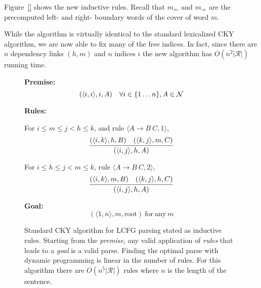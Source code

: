 \documentclass[11pt,letterpaper]{article}
\DeclareMathOperator*{\argmax}{arg\,max}
\newcommand{\rules}{\mathcal{R}}
\newcommand{\Left}[1]{#1_{\Leftarrow}}
\newcommand{\Right}[1]{#1_{\Rightarrow}}
\newcommand{\Span}[1]{\langle #1 \rangle}
\newcommand{\tri}{\Span{\Left{m}, \Right{m}}}
\begin{document}

Figure~\ref{} shows the new inductive rules.
Recall that $\Left{m}$ and $\Right{m}$ are the precomputed left- and right- boundary words of the cover of word $m$.

While the algorithm is virtually identical to the standard lexicalized CKY algorithm, we are now able to fix many of the free indices. In fact, since there are $n$ dependency links $(h, m)$ and $n$ indices $i$ the new algorithm has $O(n^2|\rules|)$ running time.


\begin{figure}
  \noindent \textbf{Premise:}
  \[(\Span{i, i}, i, A)\ \ \ \forall i \in \{1 \ldots n\}, A \in {\cal N}\]

  \noindent\textbf{Rules:}


   For $i\leq m \leq j < h \leq k$,  and  rule  $\langle A \rightarrow B\ C, 1\rangle$,
   \[\infer{( \Span{i, j},  h,  A)}{( \Span{i, k}, h, B)  &  ( \Span{k, j}, m, C) } \]

   For $i\leq h \leq j < m \leq k$, rule  $\langle A \rightarrow B\ C,  2\rangle$,
   \[\infer{(\Span{i, j},  h, A)}{(\Span{i, k}, m, B)  &  (\Span{k, j}, h, C) }  \]

\noindent \textbf{Goal:}\[ (\Span{1, n}, m, \mathrm{root}) \mathrm{\ for\ any }\ m\]
\label{fig:cky}
\caption{Standard CKY algorithm for LCFG parsing stated as inductive rules. Starting from the \textit{premise}, any valid application of \textit{rules} that leads to a \textit{goal} is a valid parse. Finding the optimal parse with dynamic programming is linear in the number of rules. For this algorithm there are $O(n^5|\rules|)$ rules where $n$ is the length of the sentence.}

\end{figure}


\end{document}
